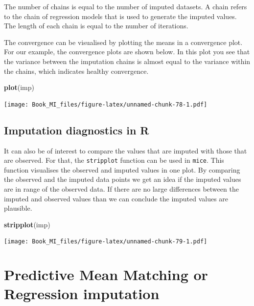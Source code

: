 \documentclass[
]{book}
\newenvironment{Shaded}{\begin{snugshade}}{\end{snugshade}}
\newcommand{\KeywordTok}[1]{\textcolor[rgb]{0.13,0.29,0.53}{\textbf{#1}}}
\newcommand{\NormalTok}[1]{#1}
\begin{document}
The number of chains is equal to the number of imputed datasets. A chain
refers to the chain of regression models that is used to generate the
imputed values. The length of each chain is equal to the number of
iterations.

The convergence can be visualised by plotting the means in a convergence
plot. For our example, the convergence plots are shown below. In this
plot you see that the variance between the imputation chains is almost
equal to the variance within the chains, which indicates healthy
convergence.

\begin{Shaded}
\begin{Highlighting}[]
\KeywordTok{plot}\NormalTok{(imp)}
\end{Highlighting}
\end{Shaded}

\texttt{[image: Book\_MI\_files/figure-latex/unnamed-chunk-78-1.pdf]}

\hypertarget{imputation-diagnostics-in-r}{%
\subsection{Imputation diagnostics in
R}\label{imputation-diagnostics-in-r}}

It can also be of interest to compare the values that are imputed with
those that are observed. For that, the \texttt{stripplot} function can
be used in \texttt{mice}. This function visualises the observed and
imputed values in one plot. By comparing the observed and the imputed
data points we get an idea if the imputed values are in range of the
observed data. If there are no large differences between the imputed and
observed values than we can conclude the imputed values are plausible.

\begin{Shaded}
\begin{Highlighting}[]
\KeywordTok{stripplot}\NormalTok{(imp)}
\end{Highlighting}
\end{Shaded}

\texttt{[image: Book\_MI\_files/figure-latex/unnamed-chunk-79-1.pdf]}

\hypertarget{predictive-mean-matching-or-regression-imputation}{%
\section{Predictive Mean Matching or Regression
imputation}\label{predictive-mean-matching-or-regression-imputation}}
\end{document}

